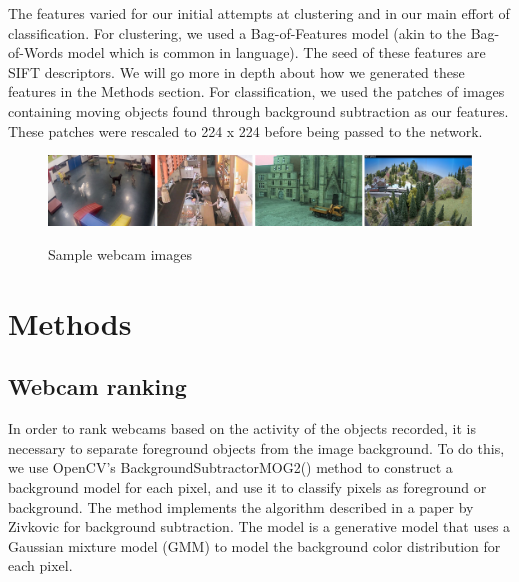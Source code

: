 \documentclass[10pt]{article} %
\begin{document}
The features varied for our initial attempts at clustering and in our main
effort of classification. For clustering, we used a Bag-of-Features model (akin
to the Bag-of-Words model which is common in language). The seed of these
features are SIFT descriptors. We will go more in depth about how we generated
these features in the Methods section. For classification, we used the patches
of images containing moving objects found through background subtraction as our
features. These patches were rescaled to 224 x 224 before being passed to the
network.

\begin{figure}[h]
\caption{Sample webcam images}
\includegraphics[scale = 0.25]{samples}
\label{samplePics}
\end{figure}

\section{Methods}
\subsection{Webcam ranking}
In order to rank webcams based on the activity of the objects recorded, it is necessary to separate foreground objects from the image background. To do this, we use OpenCV's \cite{opencv} BackgroundSubtractorMOG2() method to construct a background model for each pixel, and use it to classify pixels as foreground or background. The method implements the algorithm described in a paper by Zivkovic \cite{zivkovic} for background subtraction. The model is a generative model that uses a Gaussian mixture model (GMM) to model the background color distribution for each pixel. 
\end{document}
